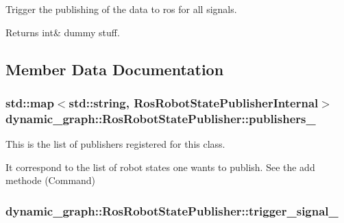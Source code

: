 Trigger the publishing of the data to ros for all signals. 

\begin{DoxyReturn}{Returns}
int\& dummy stuff. 
\end{DoxyReturn}


\subsection{Member Data Documentation}
\subsubsection[{\texorpdfstring{publishers\+\_\+}{publishers_}}]{\setlength{\rightskip}{0pt plus 5cm}std\+::map$<$std\+::string, {\bf Ros\+Robot\+State\+Publisher\+Internal}$>$ dynamic\+\_\+graph\+::\+Ros\+Robot\+State\+Publisher\+::publishers\+\_\+\hspace{0.3cm}{\ttfamily [private]}}\hypertarget{classdynamic__graph_1_1RosRobotStatePublisher_a556fe3ed8d7c0786e0d6aad4cbb415db}{}\label{classdynamic__graph_1_1RosRobotStatePublisher_a556fe3ed8d7c0786e0d6aad4cbb415db}


This is the list of publishers registered for this class. 

It correspond to the list of robot states one wants to publish. See the add methode (Command) 
\subsubsection[{\texorpdfstring{trigger\+\_\+signal\+\_\+}{trigger_signal_}}]{ dynamic\+\_\+graph\+::\+Ros\+Robot\+State\+Publisher\+::trigger\+\_\+signal\+\_\+\hspace{0.3cm}{\ttfamily [private]}}\hypertarget{classdynamic__graph_1_1RosRobotStatePublisher_a175914c0624474d019cb1360fa9c14e4}{}\label{classdynamic__graph_1_1RosRobotStatePublisher_a175914c0624474d019cb1360fa9c14e4}


